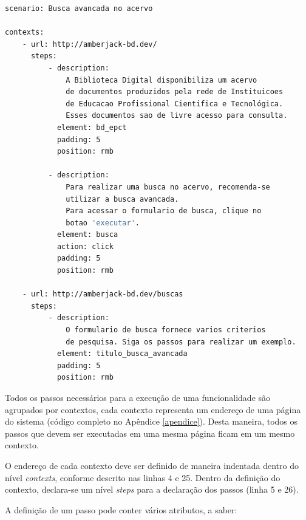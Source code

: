 {\singlespace
\begin{lstlisting}[caption=Cenário descrito em YAML,language=Bash,label={lst:codigo_cenario_yaml}]
scenario: Busca avancada no acervo

contexts:
    - url: http://amberjack-bd.dev/
      steps:
          - description:
              A Biblioteca Digital disponibiliza um acervo
              de documentos produzidos pela rede de Instituicoes
              de Educacao Profissional Cientifica e Tecnológica.
              Esses documentos sao de livre acesso para consulta.
            element: bd_epct
            padding: 5
            position: rmb

          - description:
              Para realizar uma busca no acervo, recomenda-se
              utilizar a busca avancada.
              Para acessar o formulario de busca, clique no
              botao 'executar'.
            element: busca
            action: click
            padding: 5
            position: rmb

    - url: http://amberjack-bd.dev/buscas
      steps:
          - description:
              O formulario de busca fornece varios criterios
              de pesquisa. Siga os passos para realizar um exemplo.
            element: titulo_busca_avancada
            padding: 5
            position: rmb
\end{lstlisting}
}

Todos os passos necessários para a execução de uma funcionalidade são agrupados por contextos, cada contexto representa um endereço de uma página do sistema (código completo no Apêndice \ref{apendice}). Desta maneira, todos os passos que devem ser executadas em uma mesma página ficam em um mesmo contexto.

O endereço de cada contexto deve ser definido de maneira indentada dentro do nível \textit{contexts}, conforme descrito nas linhas 4 e 25. Dentro da definição do contexto, declara-se um nível \textit{steps} para a declaração dos passos (linha 5 e 26).

A definição de um passo pode conter vários atributos, a saber:

